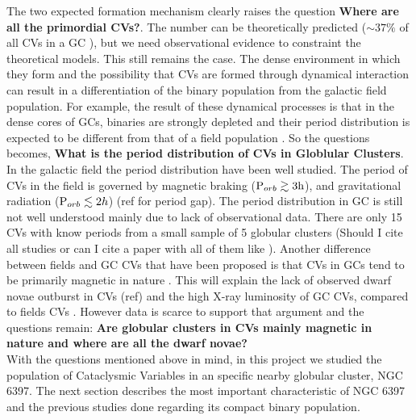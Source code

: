 The two expected formation mechanism clearly raises the question \textbf{Where are all the primordial CVs?}. The number can be theoretically predicted ($\sim 37 \%$ of all CVs in a GC \citep{ivanova_formation_2006}), but we need observational evidence to constraint the theoretical models. This still remains the case. The dense environment in which they form and the possibility that CVs are formed through dynamical interaction can result in a differentiation of the binary population from the galactic field population. For example, the result of these dynamical processes is that in the dense cores of GCs, binaries are strongly depleted and their period distribution is expected to be different from that of a field population \citep{ivanova_evolution_2005}. So the questions becomes, \textbf{What is the period distribution of CVs in Globlular Clusters}. In the galactic field the period distribution have been well studied. The period of CVs in the field is governed by magnetic braking ($\text P _{orb} \gtrsim  3 \text h$), and gravitational radiation ($\text P _{orb} \lesssim 2 h$) (ref for period gap). The period distribution in GC is still not well understood mainly due to lack of observational data. There are only 15 CVs with know periods from a small sample of 5 globular clusters (Should I cite all studies or can I cite a paper with all of them like  \cite{knigge_cataclysmic_2012}). Another difference between fields and GC CVs that have been proposed is that CVs in GCs tend to be primarily magnetic in nature \citep{grindlay_magnetic_1999}. This will explain the lack of observed dwarf novae outburst in CVs (ref) and the high X-ray luminosity of GC CVs, compared to fields CVs \citep{verbunt_cataclysmic_1997}. However data is scarce to support that argument and the questions remain: \textbf{Are globular clusters in CVs mainly magnetic in nature and where are all the dwarf novae?} \\

With the questions mentioned above in mind, in this project we studied the population of Cataclysmic Variables in an specific nearby globular cluster, NGC 6397. The next section describes the most important characteristic of NGC 6397 and the previous studies done regarding its compact binary population. 



